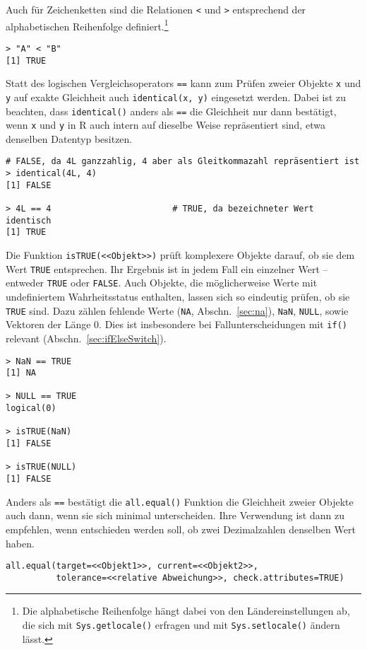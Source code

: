 Auch für Zeichenketten sind die Relationen \lstinline!<! und \lstinline!>! entsprechend der alphabetischen Reihenfolge definiert.\footnote{\label{ftn:locale}Die alphabetische Reihenfolge hängt dabei von den Ländereinstellungen ab, die sich mit \lstinline!Sys.getlocale()! erfragen und mit \lstinline!Sys.setlocale()! ändern lässt.}
\begin{lstlisting}
> "A" < "B"
[1] TRUE
\end{lstlisting}

Statt des logischen Vergleichsoperators \lstinline!==! kann zum Prüfen zweier Objekte \lstinline!x! und \lstinline!y! auf exakte Gleichheit auch \lstinline!identical(x, y)! eingesetzt werden. Dabei ist zu beachten, dass \lstinline!identical()! anders als \lstinline!==! die Gleichheit nur dann bestätigt, wenn \lstinline!x! und \lstinline!y! in R auch intern auf dieselbe Weise repräsentiert sind, etwa denselben Datentyp besitzen.
\begin{lstlisting}
# FALSE, da 4L ganzzahlig, 4 aber als Gleitkommazahl repräsentiert ist
> identical(4L, 4)
[1] FALSE

> 4L == 4                        # TRUE, da bezeichneter Wert identisch
[1] TRUE
\end{lstlisting}

Die Funktion \lstinline!isTRUE(<<Objekt>>)! prüft komplexere Objekte darauf, ob sie dem Wert \lstinline!TRUE! entsprechen. Ihr Ergebnis ist in jedem Fall ein einzelner Wert -- entweder \lstinline!TRUE! oder \lstinline!FALSE!. Auch Objekte, die möglicherweise Werte mit undefiniertem Wahrheitsstatus enthalten, lassen sich so eindeutig prüfen, ob sie \lstinline!TRUE! sind. Dazu zählen fehlende Werte (\lstinline!NA!, Abschn.\ \ref{sec:na}), \lstinline!NaN!, \lstinline!NULL!, sowie Vektoren der Länge 0. Dies ist insbesondere bei Fallunterscheidungen mit \lstinline!if()! relevant (Abschn.\ \ref{sec:ifElseSwitch}).
\begin{lstlisting}
> NaN == TRUE
[1] NA

> NULL == TRUE
logical(0)

> isTRUE(NaN)
[1] FALSE

> isTRUE(NULL)
[1] FALSE
\end{lstlisting}

Anders als \lstinline!==! bestätigt die \lstinline!all.equal()! Funktion die Gleichheit zweier Objekte auch dann, wenn sie sich minimal unterscheiden. Ihre Verwendung ist dann zu empfehlen, wenn entschieden werden soll, ob zwei Dezimalzahlen denselben Wert haben.
\begin{lstlisting}
all.equal(target=<<Objekt1>>, current=<<Objekt2>>,
          tolerance=<<relative Abweichung>>, check.attributes=TRUE)
\end{lstlisting}

